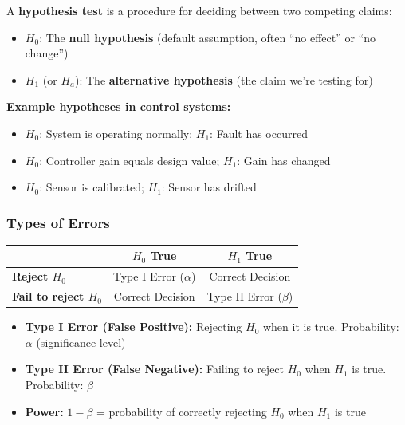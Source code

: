 \begin{definitionbox}[title=Definition: Hypothesis Test]
A \textbf{hypothesis test} is a procedure for deciding between two competing claims:
\begin{itemize}
    \item $H_0$: The \textbf{null hypothesis} (default assumption, often ``no effect'' or ``no change'')
    \item $H_1$ (or $H_a$): The \textbf{alternative hypothesis} (the claim we're testing for)
\end{itemize}
\end{definitionbox}

\textbf{Example hypotheses in control systems:}
\begin{itemize}
    \item $H_0$: System is operating normally; $H_1$: Fault has occurred
    \item $H_0$: Controller gain equals design value; $H_1$: Gain has changed
    \item $H_0$: Sensor is calibrated; $H_1$: Sensor has drifted
\end{itemize}

\subsubsection{Types of Errors}

\begin{definitionbox}[title=Definition: Type I and Type II Errors]
\begin{center}
\begin{tabular}{l|cc}
& \textbf{$H_0$ True} & \textbf{$H_1$ True} \\
\hline
\textbf{Reject $H_0$} & Type I Error ($\alpha$) & Correct Decision \\
\textbf{Fail to reject $H_0$} & Correct Decision & Type II Error ($\beta$) \\
\end{tabular}
\end{center}
\begin{itemize}
    \item \textbf{Type I Error (False Positive):} Rejecting $H_0$ when it is true. Probability: $\alpha$ (significance level)
    \item \textbf{Type II Error (False Negative):} Failing to reject $H_0$ when $H_1$ is true. Probability: $\beta$
    \item \textbf{Power:} $1 - \beta$ = probability of correctly rejecting $H_0$ when $H_1$ is true
\end{itemize}
\end{definitionbox}

